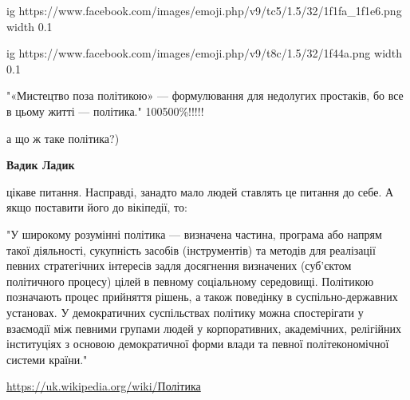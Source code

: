 \begin{itemize}
\ifcmt
  ig https://www.facebook.com/images/emoji.php/v9/tc5/1.5/32/1f1fa_1f1e6.png
  width 0.1

	ig https://www.facebook.com/images/emoji.php/v9/t8c/1.5/32/1f44a.png
  width 0.1
\fi


 

"«Мистецтво поза політикою» — формулювання для недолугих простаків, бо все в
цьому житті — політика." 100500\%!!!!!

\begin{itemize}
 
а що ж таке політика?)

 
\textbf{Вадик Ладик} 

цікаве питання. Насправді, занадто мало людей ставлять це питання до себе. А
якщо поставити його до вікіпедії, то:

"У широкому розумінні політика — визначена частина, програма або напрям такої
діяльності, сукупність засобів (інструментів) та методів для реалізації певних
стратегічних інтересів задля досягнення визначених (суб'єктом політичного
процесу) цілей в певному соціальному середовищі. Політикою позначають процес
прийняття рішень, а також поведінку в суспільно-державних установах. У
демократичних суспільствах політику можна спостерігати у взаємодії між певними
групами людей у корпоративних, академічних, релігійних інституціях з основою
демократичної форми влади та певної політекономічної системи країни."

\url{https://uk.wikipedia.org/wiki/Політика}

 

\end{itemize}
\end{itemize}
